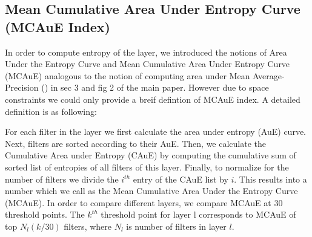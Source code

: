 \documentclass[runningheads]{llncs}
\begin{document}
\subsection{Mean Cumulative Area Under Entropy Curve (MCAuE Index)}
In order to compute entropy of the layer, we introduced the notions of Area Under the Entropy Curve and Mean Cumulative Area Under Entropy Curve (MCAuE) analogous to the notion of computing area under Mean Average-Precision (\cite{Pascal}) in sec 3 and fig 2 of the main paper. However due to space constraints we could only provide a breif defintion of MCAuE index. A detailed definition is as following:

For each filter in the layer we first calculate the area under entropy (AuE) curve. Next, filters are sorted according to their AuE. Then, we calculate the Cumulative Area under Entropy (CAuE) by computing the cumulative sum of sorted list of entropies of all filters of this layer. Finally, to normalize for the number of filters we divide the $i^{th}$ entry of the CAuE list by $i$. This results into a number which we call as the Mean Cumulative Area Under the Entropy Curve (MCAuE). In order to compare different layers, we compare MCAuE at 30 threshold points. The  $k^{th}$ threshold point for layer l corresponds to MCAuE of top $N_l(k/30)$ filters, where $N_l$ is number of filters in layer $l$.
\end{document}
